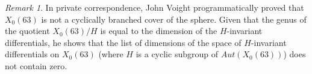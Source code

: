 \documentclass[12pt,reqno]{amsart}
\theoremstyle{definition}
\theoremstyle{remark}
\newtheorem*{remark}{Remark}
\begin{document}
\begin{remark} In private correspondence, John Voight programmatically proved that $X_0(63)$ is not a cyclically branched cover of the sphere. Given that the genus of the quotient $X_0(63)/H$ is equal to the dimension of the $H$-invariant differentials, he shows that the list of dimensions of the space of $H$-invariant differentials on $X_0(63)$ (where $H$ is a cyclic subgroup of $Aut(X_0(63))$) does not contain zero. 
 \end{remark} 

\end{document}
